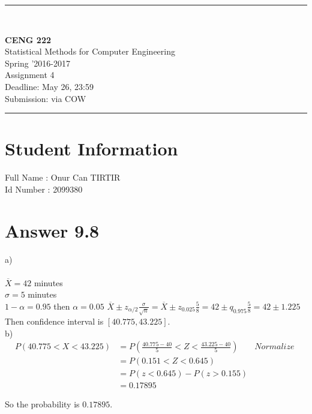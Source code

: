 \documentclass[12pt]{article}
\newcommand{\HRule}{\rule{\linewidth}{1mm}}
\begin{document}
\noindent
\HRule \\[3mm]
\begin{flushright}
\LARGE \textbf{CENG 222}  \\[4mm]
\Large Statistical Methods for Computer Engineering \\[4mm]
\normalsize      Spring '2016-2017 \\
\Large   Assignment 4 \\
\normalsize Deadline: May 26, 23:59 \\
\normalsize Submission: via COW
\end{flushright}
\HRule

\section*{Student Information }
Full Name :  Onur Can TIRTIR\\
Id Number :  2099380\\

\section*{Answer 9.8}
a)\\ \\
$\overline X = 42$ minutes\\
$\sigma = 5$ minutes\\
$1 - \alpha = 0.95$ then $\alpha = 0.05$
$\overline X \pm z_{\alpha / 2} \frac{\sigma}{\sqrt n}= \overline X \pm z_{0.025} \frac{5}{8} = 42 \pm q_{0.975} \frac{5}{8} = 42 \pm 1.225$\\
Then confidence interval is $[40.775, 43.225]$.\\

b)\\

\begin{align*}
P(40.775 < X < 43.225) &= P(\frac{40.775-40}{5} < Z < \frac{43.225-40}{5}) & \textit{Normalize } \\
                       &= P(0.151 < Z < 0.645) \\
                       &= P(z < 0.645) - P(z > 0.155) \\
                       &= 0.17895
\end{align*}

So the probability is $0.17895$.
\end{document}
